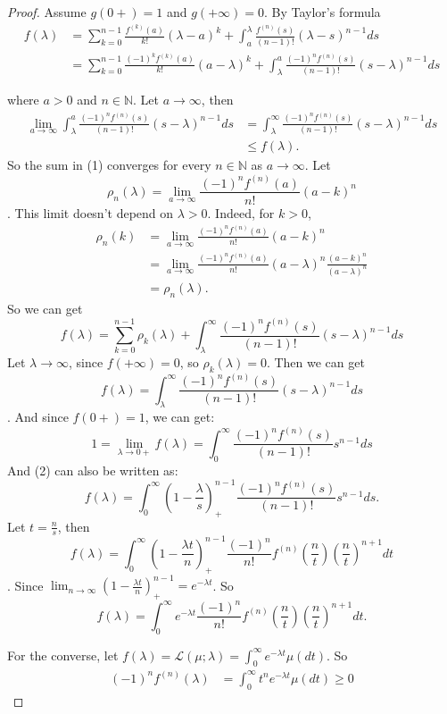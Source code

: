 \documentclass[11pt]{article}
\def\ML{{\mathcal L}}
\def\BN{{\mathbb N}}
\begin{document}
\begin{proof}
  Assume $g(0+) = 1$ and $g(+\infty) = 0$. By Taylor's formula
  \begin{equation}\begin{split} 
    f(\lambda) &= \sum_{k=0}^{n-1} \frac{f^{(k)}(a)}{k!} (\lambda - a)^k + \int_a^\lambda \frac{f^{(n)}(s)}{(n-1)!}(\lambda - s)^{n-1} ds \\
    &= \sum_{k=0}^{n-1} \frac{(-1)^k f^{(k)}(a)}{k!} (a-\lambda)^k + \int_\lambda^a \frac{(-1)^nf^{(n)}(s)}{(n-1)!} (s-\lambda)^{n-1} ds  
  \end{split}\end{equation}
  
  where $a > 0$ and $n \in \BN$. Let $a \to \infty$, then 
  \[\begin{split}
    \lim_{a\to\infty} \int_\lambda^a \frac{(-1)^n f^{(n)}(s)}{(n-1)!} (s-\lambda)^{n-1} ds &= 
    \int_\lambda^\infty \frac{(-1)^n f^{(n)}(s)}{(n-1)!} (s-\lambda)^{n-1} ds \\
    &\leq f(\lambda).
  \end{split}\]
  So the sum in (1) converges for every $n \in \BN$ as $a \to \infty$. Let 
  \[ \rho_n(\lambda) = \lim_{a \to \infty} \frac{(-1)^n f^{(n)}(a)}{n!} (a-k)^n\].
  This limit doesn't depend on $\lambda > 0$. Indeed, for $k>0$,
  \[\begin{split}
    \rho_n(k) &= \lim_{a \to \infty} \frac{(-1)^n f^{(n)}(a)}{n!} (a - k)^n  \\
    &= \lim_{a \to \infty} \frac{(-1)^n f^{(n)}(a)}{n!} (a-\lambda)^n \frac{(a -k)^n}{(a-\lambda)^n} \\
    &= \rho_n(\lambda).
  \end{split}\]
  So we can get 
  \[ f(\lambda) = \sum_{k=0}^{n-1} \rho_k(\lambda) + \int_\lambda^\infty \frac{(-1)^n f^{(n)}(s)}{(n-1)!} (s-\lambda)^{n-1} ds\]
  Let $\lambda \to \infty$, since $f(+\infty) = 0$, so $\rho_k(\lambda) = 0$. Then we can get 
  \begin{equation} f(\lambda) = \int_\lambda^\infty \frac{(-1)^nf^{(n)}(s)}{(n-1)!}(s-\lambda)^{n-1} ds\end{equation}. 
  And since $f(0+) = 1$, we can get:
  \[1 = \lim_{\lambda \to 0+} f(\lambda) = \int_0^\infty \frac{(-1)^nf^{(n)}(s)}{(n-1)!} s^{n-1} ds\]
  And (2) can also be written as:
  \[ f(\lambda) = \int_0^\infty (1-\frac{\lambda}{s})_+^{n-1} \frac{(-1)^nf^{(n)}(s)}{(n-1)!} s^{n-1}ds. \]
 Let $t = \frac{n}{s}$, then 
 \[ f(\lambda) = \int_0^\infty (1-\frac{\lambda t}{n})^{n-1}_+ \frac{(-1)^n}{n!}f^{(n)}(\frac{n}{t}) (\frac{n}{t})^{n+1} dt\].
 Since $\lim_{n\to\infty} (1-\frac{\lambda t}{n})^{n-1}_+ = e^{-\lambda t}$. So
 \[ f(\lambda) = \int_0^\infty e^{-\lambda t} \frac{(-1)^n}{n!}f^{(n)}(\frac{n}{t}) (\frac{n}{t})^{n+1} dt.\]
 
 
 For the converse, let $f(\lambda) = \ML(\mu; \lambda) = \int_0^\infty e^{-\lambda t} \mu(dt)$. So
 \[\begin{split}(-1)^n f^{(n)}(\lambda) &= \int_0^\infty t^n e^{-\lambda t} \mu(dt) \geq 0  \end{split}\]

\end{proof}
\end{document}
